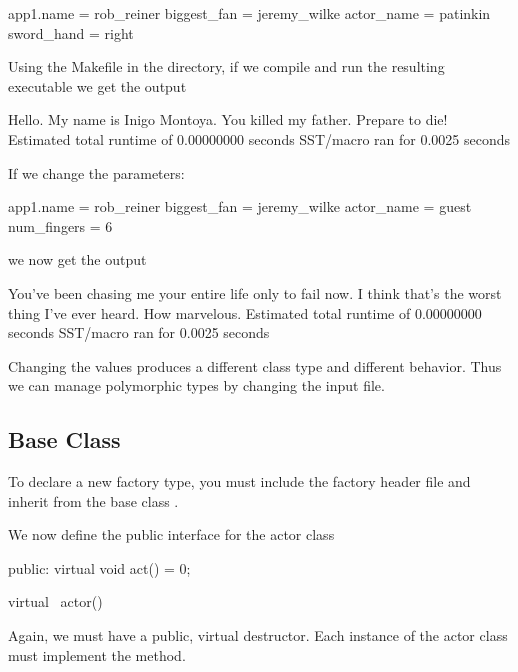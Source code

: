 \begin{ViFile}
app1.name = rob_reiner
biggest_fan = jeremy_wilke
actor_name = patinkin
sword_hand = right
\end{ViFile}

Using the Makefile in the directory, if we compile and run the resulting executable we get the output

\begin{ViFile}
Hello. My name is Inigo Montoya. You killed my father. Prepare to die!
Estimated total runtime of           0.00000000 seconds
SST/macro ran for       0.0025 seconds
\end{ViFile}

If we change the parameters:

\begin{ViFile}
app1.name = rob_reiner
biggest_fan = jeremy_wilke
actor_name = guest
num_fingers = 6
\end{ViFile}

we now get the output

\begin{ViFile}
You've been chasing me your entire life only to fail now.
I think that's the worst thing I've ever heard. How marvelous.
Estimated total runtime of           0.00000000 seconds
SST/macro ran for       0.0025 seconds
\end{ViFile}

Changing the values produces a different class type and different behavior.
Thus we can manage polymorphic types by changing the input file.

\subsection{Base Class}\label{subsec:baseClass}
To declare a new factory type, you must include the factory header file and inherit from the base class .

\begin{CppCode}
#include <sprockit/factories/factory.h>

namespace sstmac {
    namespace tutorial {

class actor :
    public sprockit::factory_type
{
\end{CppCode}


We now define the public interface for the actor class

\begin{CppCode}
 public:
  virtual void
  act() = 0;

  virtual ~actor(){}
\end{CppCode}
Again, we must have a public, virtual destructor.
Each instance of the actor class must implement the  method.

